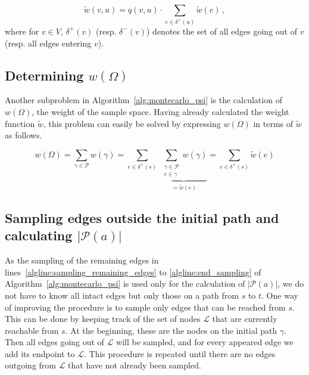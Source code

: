 \documentclass{article}
\begin{document}
\begin{equation}\label{eq:recursive_widetilde_w}
\widetilde{w}(v,u)=q(v,u)\cdot \underset{e\in\delta^+(u)}{\sum}\widetilde{w}(e) \, ,
\end{equation}
\noindent
where for $v\in V$, $\delta^+(v)$ (resp. $\delta^-(v)$) denotes the set of all
edges going out of $v$ (resp. all edges entering $v$).

\subsection{Determining \texorpdfstring{{$w(\Omega)$}}{$w(\Omega)$}}

Another subproblem in Algorithm~\ref{alg:montecarlo_psi} is the
calculation of $w(\Omega)$, the weight of the sample
space. Having already calculated the weight function
$\widetilde{w}$, this problem can easily be solved by
expressing $w(\Omega)$ in terms of $\widetilde{w}$
as follows.

\begin{equation*}
w(\Omega)=\sum_{\gamma \in
  \mathcal{P}}w(\gamma)=\sum_{e\in\delta^+(s)}\;\underset{=\widetilde{w}(e)}{\underbrace{\sum_{\substack{\gamma\in\mathcal{P}\\e\in\gamma}}w(\gamma)}}=\sum_{e\in\delta^+(s)}\widetilde{w}(e)
\end{equation*}


\subsection{Sampling edges outside the initial path and calculating
\texorpdfstring{{$|\mathcal{P}(a)|$}}{$|\mathcal{P}(a)|$}}\label{subsec:sampling_remaining_edges}

As the sampling of the remaining edges in
lines~\ref{algline:sampling_remaining_edges} to
\ref{algline:end_sampling} of Algorithm~\ref{alg:montecarlo_psi}
is used only for the calculation of $|\mathcal{P}(a)|$, we do not
have to know all intact edges but only those on a
path from $s$ to $t$. One way of improving the procedure is to
sample only edges that can be reached from $s$. This can be done
by keeping track of the set of nodes $\mathcal{L}$ that
are currently reachable from
$s$. At the beginning, these are the nodes on the initial path
$\gamma$. Then all edges going out of $\mathcal{L}$ will be
sampled, and for every appeared edge we add its endpoint to
$\mathcal{L}$. This procedure is repeated until there are
no edges outgoing from $\mathcal{L}$ that have not already been sampled.
\end{document}
